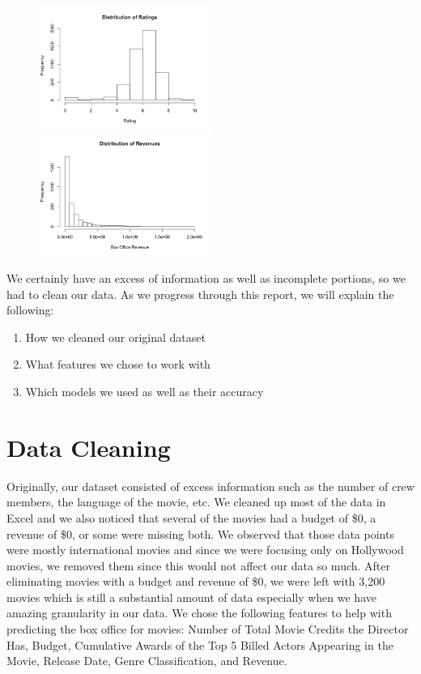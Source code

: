\documentclass{article}
\begin{document}
\begin{figure}[ht]
\includegraphics[width = 0.5\textwidth]{rating.png}
\includegraphics[width = 0.5\textwidth]{revenue.png}
\end{figure}

We certainly have an excess of information as well as incomplete portions, so we had to clean our data. As we progress through this report, we will explain the following:  
\begin{enumerate}
    \item How we cleaned our original dataset
    \item What features we chose to work with
    \item Which models we used as well as their accuracy 
\end{enumerate}

\section*{Data Cleaning}
\vspace{0.2in}

Originally, our dataset consisted of excess information such as the number of crew members, the language of the movie, etc. We cleaned up most of the data in Excel and we also noticed that several of the movies had a budget of \$0, a revenue of \$0, or some were missing both. We observed that those data points were mostly international movies and since we were focusing only on Hollywood movies, we removed them since this would not affect our data so much. After eliminating movies with a budget and revenue of \$0, we were left with 3,200 movies which is still a substantial amount of data especially when we have amazing granularity in our data. We chose the following features to help with predicting the box office for movies: Number of Total Movie Credits the Director Has, Budget, Cumulative Awards of the Top 5 Billed Actors Appearing in the Movie, Release Date, Genre Classification, and Revenue.
\end{document}
